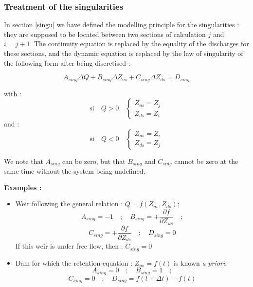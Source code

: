 \subsubsection{Treatment of the singularities} \label{TS}

In section \ref{singu} we have defined the modelling principle for the singularities : they are supposed to be located between two sections of calculation $j$ and $i = j + 1$. The continuity equation is replaced by the equality of the discharges for these sections, and the dynamic equation is replaced by the law of singularity of the following form after being discretised :

\begin{equation}
  A_{sing} \Delta Q + B_{sing} \Delta Z_{us} + C_{sing} \Delta Z_{ds} = D_{sing}
\end{equation}

with :
\begin{equation}
 \mbox{si} \quad Q > 0 \quad \left \lbrace
     \begin{array}{l}
      Z_{us} = Z_j\\
      Z_{ds} = Z_i
     \end{array}
    \right.
\end{equation}
and :
\begin{equation}
 \mbox{si} \quad Q < 0 \quad \left \lbrace
     \begin{array}{l}
      Z_{us} = Z_i\\
      Z_{ds} = Z_j
     \end{array}
    \right.
\end{equation}

\vspace{0.5cm}

We note that $A_{sing}$ can be zero, but that $B_{sing}$ and $C_{sing}$ cannot be zero at the same time without the system being undefined.

\vspace{0.5cm}

\textbf{Examples :}
\begin{itemize}
 \item Weir following the general relation : $Q = f(Z_{us},Z_{ds})$;
 $$ A_{sing} = -1 \quad;\quad B_{sing} = + \frac{\partial f}{\partial Z_{us}} \quad;$$
 $$ C_{sing} = + \frac{\partial f}{\partial Z_{ds}} \quad;\quad D_{sing} = 0 $$
 \vspace{0.25cm}
 \quad If this weir is under free flow, then : $C_{sing} = 0$
 \vspace{0.25cm}
 \item Dam for which the retention equation : $Z_{us} = f(t)$ is known \textit{a priori};
 $$ A_{sing} = 0 \quad;\quad B_{sing} = 1 \quad;$$
 $$ C_{sing} = 0 \quad;\quad D_{sing} = f(t+\Delta t)-f(t)$$
\end{itemize}

